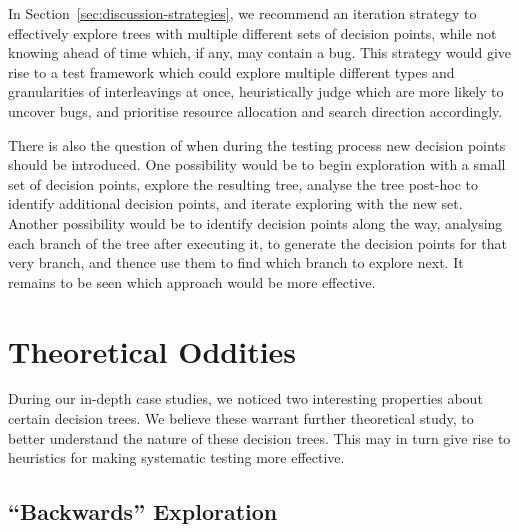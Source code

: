 In Section~\ref{sec:discussion-strategies}, we recommend an iteration strategy to effectively explore trees with multiple different sets of decision points, while not knowing ahead of time which, if any, may contain a bug.
This strategy would give rise to a test framework which could explore multiple different types and granularities of interleavings at once, heuristically judge which are more likely to uncover bugs, and prioritise resource allocation and search direction accordingly.

There is also the question of when during the testing process new decision points should be introduced.
One possibility would be to begin exploration with a small set of decision points, explore the resulting tree, analyse the tree post-hoc to identify additional decision points, and iterate exploring with the new set.
Another possibility would be to identify decision points along the way, analysing each branch of the tree after executing it, to generate the decision points for that very branch, and thence use them to find which branch to explore next.
It remains to be seen which approach would be more effective.



\section{Theoretical Oddities}
\label{sec:future-theory}

During our in-depth case studies, we noticed two interesting properties about certain decision trees. We believe these warrant further theoretical study, to better understand the nature of these decision trees. This may in turn give rise to heuristics for making systematic testing more effective.

\subsection{``Backwards'' Exploration}
\label{sec:future-backwards}

